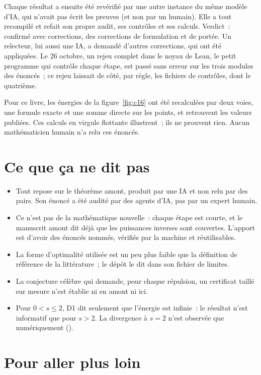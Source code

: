 Chaque résultat a ensuite été revérifié par une autre instance du même modèle d'IA, qui n'avait pas écrit les
preuves (et non par un humain). Elle a tout recompilé et refait son propre audit, ses contrôles et ses calculs.
Verdict~: \og confirmé avec corrections\fg, des corrections de formulation et de portée. Un relecteur, lui aussi une
IA, a demandé d'autres corrections, qui ont été appliquées. Le 26 octobre, un rejeu complet dans le noyau de Lean,
le petit programme qui contrôle chaque étape, est passé sans erreur sur les trois modules des énoncés~; ce rejeu
laissait de côté, par règle, les fichiers de contrôles, dont le quatrième.

Pour ce livre, les énergies de la figure~\ref{fig:c16} ont été recalculées par deux voies, une formule exacte et une
somme directe sur les points, et retrouvent les valeurs publiées. Ces calculs en virgule flottante illustrent~; ils
ne prouvent rien.
Aucun mathématicien humain n'a relu ces énoncés.

\section*{Ce que ça ne dit pas}

\begin{limite}
\begin{itemize}
\item Tout repose sur le théorème amont, produit par une IA et non relu par des pairs. Son énoncé a été audité par
  des agents d'IA, pas par un expert humain.
\item Ce n'est pas de la mathématique nouvelle~: chaque étape est courte, et le manuscrit amont dit déjà que les
  puissances inverses sont couvertes. L'apport est d'avoir des énoncés nommés, vérifiés par la machine et
  réutilisables.
\item La forme d'optimalité utilisée est un peu plus faible que la définition de référence de la littérature~;
  le dépôt le dit dans son fichier de limites.
\item La conjecture célèbre qui demande, pour chaque répulsion, un certificat taillé sur mesure n'est établie ni
  en amont ni ici.
\item Pour $0<s\le2$, D1 dit seulement que l'énergie est infinie~: le résultat n'est informatif que pour $s>2$.
  La divergence à $s=2$ n'est observée que numériquement ().
\end{itemize}
\end{limite}

\section*{Pour aller plus loin}

